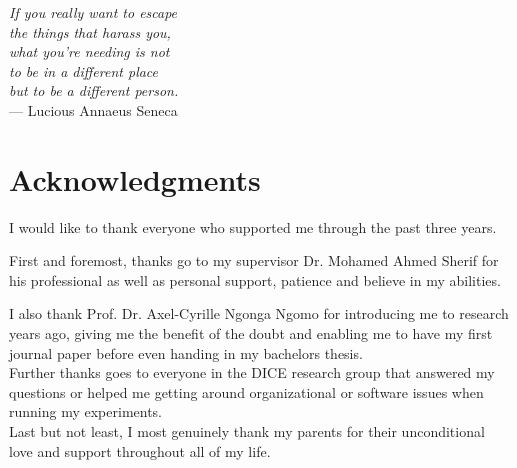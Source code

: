 
\begin{flushright}{\slshape
If you really want to escape \\
the things that harass you, \\
what you’re needing is not \\
to be in a different place\\
but to be a different person.} \\ \medskip
    --- Lucious Annaeus Seneca \end{flushright}
\bigskip

\begingroup
\let\clearpage\relax
\let\cleardoublepage\relax
\let\cleardoublepage\relax
\chapter*{Acknowledgments}
I would like to thank everyone who supported me through the past three years.

First and foremost, thanks go to my supervisor Dr. Mohamed Ahmed Sherif for his professional as well as personal support, patience and believe in my abilities.

I also thank Prof. Dr. Axel-Cyrille Ngonga Ngomo for introducing me to research years ago, giving me the benefit of the doubt and enabling me to have my first journal paper before even handing in my bachelors thesis.\\

Further thanks goes to everyone in the DICE research group that answered my questions or helped me getting around organizational or software issues when running my experiments.\\

Last but not least, I most genuinely thank my parents for their unconditional love and support throughout all of my life.
\endgroup
